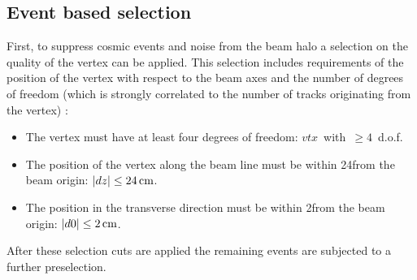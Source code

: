\subsection{Event based selection}
\label{sec:EventBasedSelection}
First, to suppress cosmic events and noise from the beam halo a selection on the quality of the vertex can be applied.
This selection includes requirements of the position of the vertex with respect to the beam axes and the number of degrees of freedom (which is strongly correlated to the number of tracks originating from the vertex) \cite{bib:CMS:Tracking_7TeV_PAS}:  
\begin{itemize}
\renewcommand{\labelitemi}{\footnotesize{\ding{118}}}
\item The vertex must have at least four degrees of freedom: \mbox{$vtx$ with $\geq 4$ d.o.f.}
\item The position of the vertex along the beam line must be within 24\cm from the beam origin: \mbox{$|dz| \leq 24\,\text{cm}$.}
\item The position in the transverse direction must be within 2\cm from the beam origin: \mbox{$|d0| \leq 2\,\text{cm}$.}
\end{itemize}
After these selection cuts are applied the remaining events are subjected to a further preselection.\\

